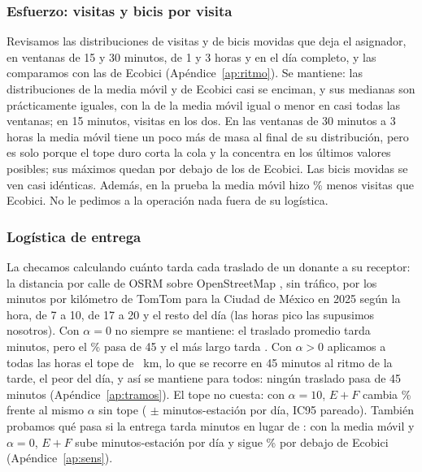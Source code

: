 \documentclass[conference,letterpaper,10pt]{IEEEtran}
\newcommand{\EF}{E+F}
\begin{document}
\subsubsection{Esfuerzo: visitas y bicis por visita}
Revisamos las distribuciones de visitas y de bicis movidas que deja el asignador, en ventanas de 15 y 30 minutos, de 1 y 3 horas y en el día completo, y las comparamos con las de Ecobici (Apéndice~\ref{ap:ritmo}). Se mantiene: las distribuciones de la media móvil y de Ecobici casi se enciman, y sus medianas son prácticamente iguales, con la de la media móvil igual o menor en casi todas las ventanas; en 15 minutos, \rtQuinceMaMed{} visitas en los dos. En las ventanas de 30 minutos a 3 horas la media móvil tiene un poco más de masa al final de su distribución, pero es solo porque el tope duro corta la cola y la concentra en los últimos valores posibles; sus máximos quedan por debajo de los de Ecobici. Las bicis movidas se ven casi idénticas. Además, en la prueba la media móvil hizo \rmaVisPct\% menos visitas que Ecobici. No le pedimos a la operación nada fuera de su logística.

\subsubsection{Logística de entrega}\label{sec:alfa}\label{sec:tramos}\label{sec:sens}
La checamos calculando cuánto tarda cada traslado de un donante a su receptor: la distancia por calle de OSRM \cite{luxen2011} sobre OpenStreetMap \cite{osm}, sin tráfico, por los minutos por kilómetro de TomTom para la Ciudad de México en 2025 \cite{tomtom2025} según la hora, \tfMpkAm{} de 7 a 10, \tfMpkPm{} de 17 a 20 y \tfMpkDia{} el resto del día (las horas pico las supusimos nosotros). Con $\alpha=0$ no siempre se mantiene: el traslado promedio tarda \tfCeroMin{} minutos, pero el \tfCeroPCuarentaCinco\% pasa de 45 y el más largo tarda \tfCeroMax. Con $\alpha>0$ aplicamos a todas las horas el tope de \tfLimKm~km, lo que se recorre en 45 minutos al ritmo de la tarde, el peor del día, y así se mantiene para todos: ningún traslado pasa de 45 minutos (Apéndice~\ref{ap:tramos}). El tope no cuesta: con $\alpha=10$, $\EF$ cambia \caTopeDiezEF\% frente al mismo $\alpha$ sin tope (\caTopeDiezAbs{} $\pm$ \caTopeDiezIC{} minutos-estación por día, IC95 pareado). También probamos qué pasa si la entrega tarda \rentregaLarga{} minutos en lugar de \rdelMin: con la media móvil y $\alpha=0$, $\EF$ sube \rsSetenta{} minutos-estación por día y sigue \cxLargaPct\% por debajo de Ecobici (Apéndice~\ref{ap:sens}).
\end{document}
